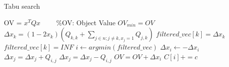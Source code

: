 \begin{algorithm}[t]
\caption{Tabu search}
\label{alg:Tabu}
\begin{algorithmic}[1]
\setlength{\itemsep}{0.2em} %
\setlength{\baselineskip}{0.8em} %
\small
\STATE OV = $x^TQx$ $\;\;\;\;\;\;$ \small \%OV: Object Value \normalsize
\vspace{-1.5pt}
\STATE $OV_{min} = OV$
\vspace{-1.5pt}
\vspace{-1.5pt}
    \STATE $\Delta x_k = (1 - 2x_k) \left(Q_{k,k} + \sum_{j \in n; j \neq k, x_j = 1} 
    Q_{j,k}\right)$
    \vspace{-1.5pt}
\ENDFOR
\vspace{-1.5pt}
\vspace{-1.5pt}
    \vspace{-1.5pt}
        \vspace{-1.5pt}
            \STATE $filtered\_vec[k] = \Delta x_k$
            \vspace{-1.5pt}
        \ELSE
        \vspace{-1.5pt}
            \STATE $filtered\_vec[k] = INF$
            \vspace{-1.5pt}
        \ENDIF
        \vspace{-1.5pt}
    \ENDFOR    
    \vspace{-1.5pt}
    \STATE $i \gets argmin(filtered\_vec)$ 
    \vspace{-1.5pt}
    \STATE $\Delta x_i \gets -\Delta x_i$
    \vspace{-1.5pt}
    \vspace{-1.5pt}
        \vspace{-1.5pt}
            \STATE $\Delta x_j = \Delta x_j + Q_{i,j}$
            \vspace{-1.5pt}
        \ELSE
        \vspace{-1.5pt}
            \STATE $\Delta x_j = \Delta x_j - Q_{i,j}$
            \vspace{-1.5pt}
        \ENDIF
        \vspace{-1.5pt}
    \ENDFOR
    \vspace{-1.5pt}
    \STATE $OV = OV + \Delta x_i$
    \vspace{-1.5pt}
    \STATE $C[i] += c$
    \vspace{-1.5pt}

\end{algorithmic}
\end{algorithm}
